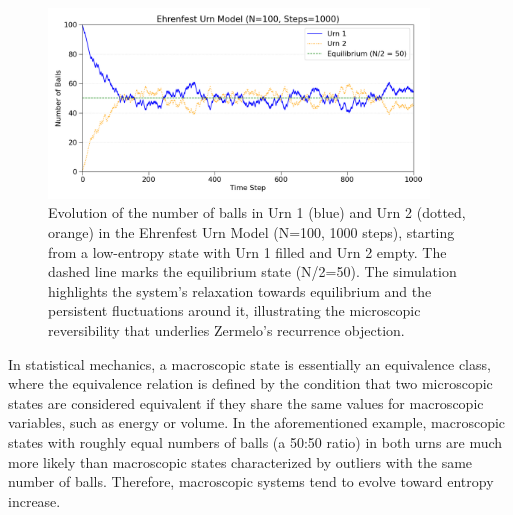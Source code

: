 \documentclass[shortAfour,sageh,times]{sagej}
\begin{document}
\begin{figure}[htbp] %
    \centering %
    \includegraphics[width=0.9\textwidth]{2025-idi-Figure_1.png}
    \caption{Evolution of the number of balls in Urn 1 (blue) and Urn 2 (dotted, orange) in the Ehrenfest Urn Model (N=100, 1000 steps), starting from a low-entropy state with Urn 1 filled and Urn 2 empty.
The dashed line marks the equilibrium state (N/2=50). The simulation highlights the system's relaxation towards equilibrium and the persistent fluctuations around it, illustrating the microscopic reversibility that underlies Zermelo's recurrence objection.}
    \label{fig:ehrenfest_sim} %
\end{figure}

In statistical mechanics, a macroscopic state is essentially an equivalence class, where the equivalence relation is defined by the condition that two microscopic states are considered equivalent if they share the same values for macroscopic variables, such as energy or volume.
In the aforementioned example, macroscopic states with roughly equal numbers of balls (a 50:50 ratio) in both urns are much more likely than macroscopic states characterized by outliers with the same number of balls.
Therefore, macroscopic systems tend to evolve toward entropy increase.
\end{document}
